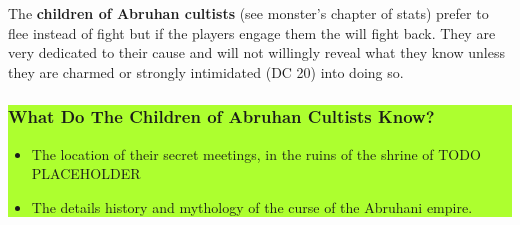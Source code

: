 \begin{multicols*}{2}
The \textbf{children of Abruhan cultists} (see monster's chapter of stats) prefer to flee instead of fight but if the players engage them the will fight back. They are very dedicated to their cause and will not willingly reveal what they know unless they are charmed or strongly intimidated (DC 20) into doing so.
\break

\colorbox{GreenYellow}{\begin{minipage}{0.4\textwidth}
		\subsubsection*{What Do The Children of Abruhan Cultists Know?}
		\begin{itemize}
			\item The location of their secret meetings, in the ruins of the shrine of TODO PLACEHOLDER
			\item The details history and mythology of the curse of the Abruhani empire.
		\end{itemize}
\end{minipage}}
\break


\end{multicols*}
\pagebreak
